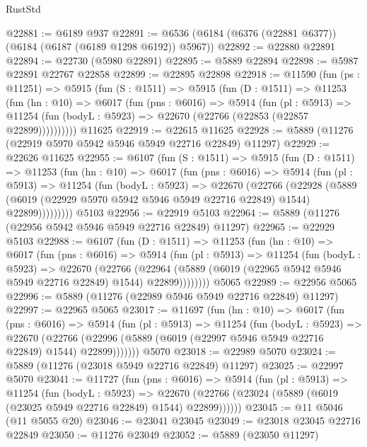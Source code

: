 \begin{lexlean}{RustStd}
\begin{coremodule}
@22881 := @6189 @937
@22891 := @6536 (@6184 (@6376 (@22881 @6377)) (@6184 (@6187 (@6189 @1298 @6192)) @5967))
@22892 := @22880 @22891
@22894 := @22730 (@5980 @22891)
@22895 := @5889 @22894
@22898 := @5987 @22891 @22767 @22858
@22899 := @22895 @22898
@22918 := @11590
    (fun (ps : @11251) =>
    @5915
      (fun (S : @1511) =>
      @5915
        (fun (D : @1511) =>
        @11253
          (fun (hn : @10) =>
          @6017
            (fun (pns : @6016) =>
            @5914
              (fun (pl : @5913) =>
              @11254 (fun (bodyL : @5923) => @22670 (@22766 (@22853 (@22857 @22899))))))))))
    @11625
@22919 := @22615 @11625
@22928 := @5889 (@11276 (@22919 @5970 @5942 @5946 @5949 @22716 @22849) @11297)
@22929 := @22626 @11625
@22955 := @6107
    (fun (S : @1511) =>
    @5915
      (fun (D : @1511) =>
      @11253
        (fun (hn : @10) =>
        @6017
          (fun (pns : @6016) =>
          @5914
            (fun (pl : @5913) =>
            @11254
              (fun (bodyL : @5923) =>
              @22670
                (@22766
                  (@22928
                    (@5889
                      (@6019 (@22929 @5970 @5942 @5946 @5949 @22716 @22849) @1544)
                      @22899)))))))))
    @5103
@22956 := @22919 @5103
@22964 := @5889 (@11276 (@22956 @5942 @5946 @5949 @22716 @22849) @11297)
@22965 := @22929 @5103
@22988 := @6107
    (fun (D : @1511) =>
    @11253
      (fun (hn : @10) =>
      @6017
        (fun (pns : @6016) =>
        @5914
          (fun (pl : @5913) =>
          @11254
            (fun (bodyL : @5923) =>
            @22670
              (@22766
                (@22964 (@5889 (@6019 (@22965 @5942 @5946 @5949 @22716 @22849) @1544) @22899))))))))
    @5065
@22989 := @22956 @5065
@22996 := @5889 (@11276 (@22989 @5946 @5949 @22716 @22849) @11297)
@22997 := @22965 @5065
@23017 := @11697
    (fun (hn : @10) =>
    @6017
      (fun (pns : @6016) =>
      @5914
        (fun (pl : @5913) =>
        @11254
          (fun (bodyL : @5923) =>
          @22670
            (@22766 (@22996 (@5889 (@6019 (@22997 @5946 @5949 @22716 @22849) @1544) @22899)))))))
    @5070
@23018 := @22989 @5070
@23024 := @5889 (@11276 (@23018 @5949 @22716 @22849) @11297)
@23025 := @22997 @5070
@23041 := @11727
    (fun (pns : @6016) =>
    @5914
      (fun (pl : @5913) =>
      @11254
        (fun (bodyL : @5923) =>
        @22670 (@22766 (@23024 (@5889 (@6019 (@23025 @5949 @22716 @22849) @1544) @22899))))))
@23045 := @11 @5046 (@11 @5055 @20)
@23046 := @23041 @23045
@23049 := @23018 @23045 @22716 @22849
@23050 := @11276 @23049
@23052 := @5889 (@23050 @11297)

\end{coremodule}
\end{lexlean}
